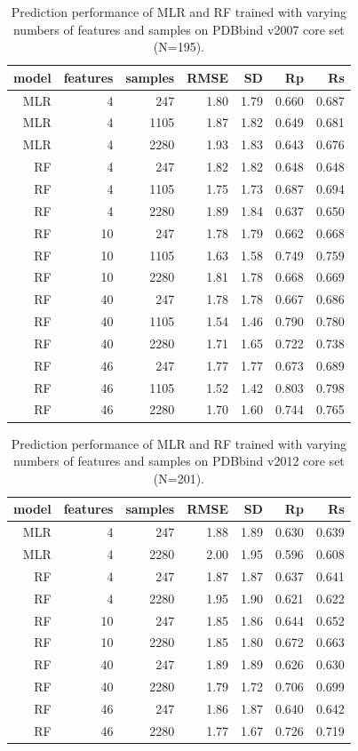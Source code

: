 \documentclass[journal=jacsat,manuscript=article]{achemso}
\begin{document}
\begin{table}
\caption{Prediction performance of MLR and RF trained with varying numbers of features and samples on PDBbind v2007 core set (N=195).}
\label{tbl:tst195}
\begin{tabular}{rrrrrrr}
\hline
model & features & samples & RMSE & SD & Rp & Rs\\
\hline
MLR &  4 &  247 & 1.80 & 1.79 & 0.660 & 0.687\\
MLR &  4 & 1105 & 1.87 & 1.82 & 0.649 & 0.681\\
MLR &  4 & 2280 & 1.93 & 1.83 & 0.643 & 0.676\\
 RF &  4 &  247 & 1.82 & 1.82 & 0.648 & 0.648\\
 RF &  4 & 1105 & 1.75 & 1.73 & 0.687 & 0.694\\
 RF &  4 & 2280 & 1.89 & 1.84 & 0.637 & 0.650\\
 RF & 10 &  247 & 1.78 & 1.79 & 0.662 & 0.668\\
 RF & 10 & 1105 & 1.63 & 1.58 & 0.749 & 0.759\\
 RF & 10 & 2280 & 1.81 & 1.78 & 0.668 & 0.669\\
 RF & 40 &  247 & 1.78 & 1.78 & 0.667 & 0.686\\
 RF & 40 & 1105 & 1.54 & 1.46 & 0.790 & 0.780\\
 RF & 40 & 2280 & 1.71 & 1.65 & 0.722 & 0.738\\
 RF & 46 &  247 & 1.77 & 1.77 & 0.673 & 0.689\\
 RF & 46 & 1105 & 1.52 & 1.42 & 0.803 & 0.798\\
 RF & 46 & 2280 & 1.70 & 1.60 & 0.744 & 0.765\\
\hline
\end{tabular}
\end{table}

\begin{table}
\caption{Prediction performance of MLR and RF trained with varying numbers of features and samples on PDBbind v2012 core set (N=201).}
\label{tbl:tst201}
\begin{tabular}{rrrrrrr}
\hline
model & features & samples & RMSE & SD & Rp & Rs\\
\hline
MLR &  4 &  247 & 1.88 & 1.89 & 0.630 & 0.639\\
MLR &  4 & 2280 & 2.00 & 1.95 & 0.596 & 0.608\\
 RF &  4 &  247 & 1.87 & 1.87 & 0.637 & 0.641\\
 RF &  4 & 2280 & 1.95 & 1.90 & 0.621 & 0.622\\
 RF & 10 &  247 & 1.85 & 1.86 & 0.644 & 0.652\\
 RF & 10 & 2280 & 1.85 & 1.80 & 0.672 & 0.663\\
 RF & 40 &  247 & 1.89 & 1.89 & 0.626 & 0.630\\
 RF & 40 & 2280 & 1.79 & 1.72 & 0.706 & 0.699\\
 RF & 46 &  247 & 1.86 & 1.87 & 0.640 & 0.642\\
 RF & 46 & 2280 & 1.77 & 1.67 & 0.726 & 0.719\\
\hline
\end{tabular}
\end{table}
\end{document}
